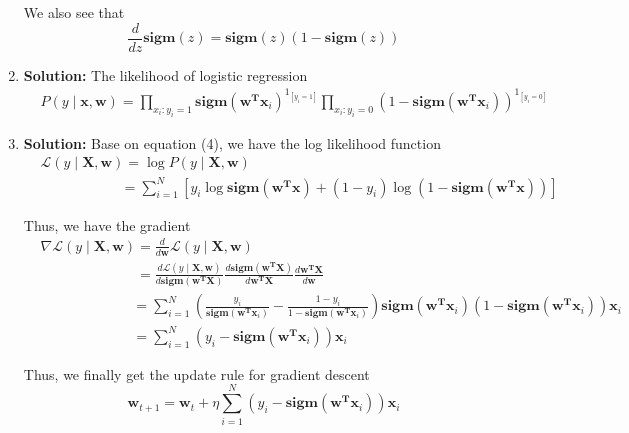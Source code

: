 \documentclass[11pt]{article}
\begin{document}
\begin{enumerate}
		We also see that
		\begin{equation}
			\frac{d}{dz}\mathbf{sigm}(z) = \mathbf{sigm}(z)(1 - \mathbf{sigm}(z))
		\end{equation}
	\item \textbf{Solution:}
		The likelihood of logistic regression
		\begin{align}
			& P(y \mid \mathbf{x, w}) = \prod_{x_i : y_i = 1} \mathbf{sigm}(\mathbf{w^Tx}_i)^{1_{[y_i = 1]}} \prod_{x_i : y_i = 0} (1 - \mathbf{sigm}(\mathbf{w^Tx}_i))^{1_{[y_i = 0]}}
		\end{align}
	\item \textbf{Solution:}
		Base on equation (4), we have the log likelihood function
		\begin{align}
			&\mathcal{L}(y \mid \mathbf{X, w}) = \log P(y \mid \mathbf{X, w})\nonumber\\
			&\phantom{\mathcal{L}(y \mid \mathbf{x, w})} = \sum_{i = 1}^N [y_i \log \mathbf{sigm}(\mathbf{w^Tx}) + (1 - y_i)\log (1 - \mathbf{sigm}(\mathbf{w^Tx}))]\nonumber
		\end{align}
		
		Thus, we have the gradient
		\begin{align}
			&\nabla \mathcal{L}(y \mid \mathbf{X, w}) = \frac{d}{d\mathbf{w}}\mathcal{L}(y \mid \mathbf{X, w})\nonumber\\
			&\phantom{\nabla \mathcal{L}(y \mid \mathbf{X, w})} = \frac{d \mathcal{L}(y \mid \mathbf{X, w})}{d \mathbf{sigm}(\mathbf{w^TX})}\frac{d \mathbf{sigm}(\mathbf{w^TX})}{d\mathbf{w^TX}}\frac{d\mathbf{w^TX}}{d\mathbf{w}}\nonumber\\
			&\phantom{\nabla \mathcal{L}(y \mid \mathbf{x, w})} = \sum_{i = 1}^N \left(\frac{y_i}{\mathbf{sigm}(\mathbf{w^Tx}_i)} - \frac{1 - y_i}{1 - \mathbf{sigm}(\mathbf{w^Tx}_i)} \right)\mathbf{sigm}(\mathbf{w^Tx}_i)(1 - \mathbf{sigm}(\mathbf{w^Tx}_i))\mathbf{x}_i\nonumber\\
			&\phantom{\nabla \mathcal{L}(y \mid \mathbf{x, w})} = \sum_{i = 1}^N (y_i - \mathbf{sigm}(\mathbf{w^Tx}_i))\mathbf{x}_i\nonumber
		\end{align}
		
		Thus, we finally get the update rule for gradient descent
		\[\mathbf{w}_{t + 1} = \mathbf{w}_{t} + \eta \sum_{i = 1}^N (y_i - \mathbf{sigm}(\mathbf{w^Tx}_i))\mathbf{x}_i\]
\end{enumerate}



\newpage \nocite{*}


\end{document}
